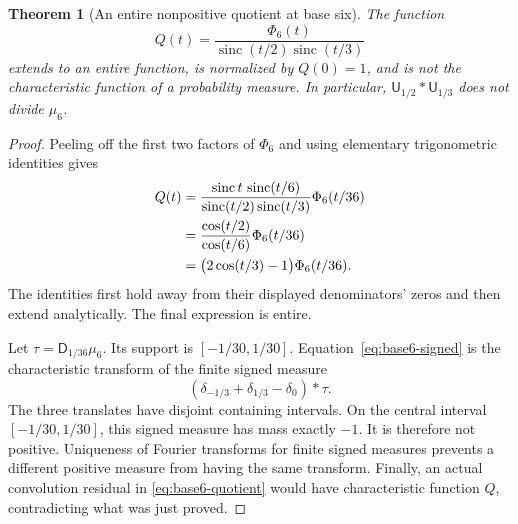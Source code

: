 \documentclass[11pt,a4paper]{article}
\newtheorem{theorem}{Theorem}[section]
\theoremstyle{remark}
\newcommand{\sinc}{\operatorname{sinc}}
\newcommand{\Unif}{\mathsf U}
\newcommand{\dil}[1]{\mathsf D_{#1}}
\begin{document}
\begin{theorem}[An entire nonpositive quotient at base six]
\label{thm:base6}
The function
\begin{equation}
 Q(t)=\frac{\Phi_6(t)}{\sinc(t/2)\sinc(t/3)}
 \label{eq:base6-quotient}
\end{equation}
extends to an entire function, is normalized by $Q(0)=1$, and is not the
characteristic function of a probability measure. In particular,
$\Unif_{1/2}*\Unif_{1/3}$ does not divide $\mu_6$.
\end{theorem}
\begin{proof}
Peeling off the first two factors of $\Phi_6$ and using elementary trigonometric
identities gives
\begin{align}
 Q(t)
 &=\frac{\sinc t\,\sinc(t/6)}{\sinc(t/2)\sinc(t/3)}\Phi_6(t/36)\notag\\
 &=\frac{\cos(t/2)}{\cos(t/6)}\Phi_6(t/36)\notag\\
 &=\bigl(2\cos(t/3)-1\bigr)\Phi_6(t/36).
 \label{eq:base6-signed}
\end{align}
The identities first hold away from their displayed denominators' zeros and
then extend analytically. The final expression is entire.

Let $\tau=\dil{1/36}\mu_6$. Its support is
$[-1/30,1/30]$. Equation~\eqref{eq:base6-signed} is the characteristic transform
of the finite signed measure
\[
 (\delta_{-1/3}+\delta_{1/3}-\delta_0)*\tau.
\]
The three translates have disjoint containing intervals. On the central
interval $[-1/30,1/30]$, this signed measure has mass exactly $-1$.
It is therefore not positive. Uniqueness of Fourier transforms for finite
signed measures prevents a different positive measure from having the same
transform. Finally, an actual convolution residual in
\eqref{eq:base6-quotient} would have characteristic function $Q$, contradicting
what was just proved.
\end{proof}
\end{document}
